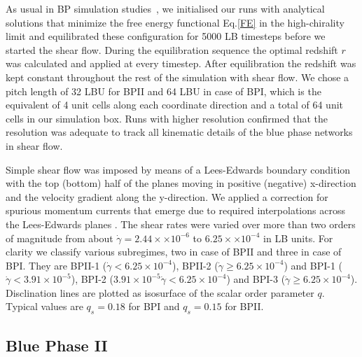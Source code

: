 \documentclass[aps,pre,reprint,superscriptaddress, twocolumn]{revtex4}
\newcommand{\e}[1]{\times10^{#1}}
\newcommand{\gd}{\dot{\gamma}}
\begin{document}
As usual in BP simulation studies~\cite{Henrich:2011a,Henrich:2010b}, we initialised our runs with 
analytical solutions that minimize the free energy functional Eq.\ref{FE} in the high-chirality limit 
and equilibrated these configuration for 5000 LB timesteps before we started the shear flow. 
During the equilibration sequence the optimal redshift $r$ was calculated and applied at every timestep.
After equilibration the redshift was kept constant throughout the rest of the simulation with shear flow.
We chose a pitch length of 32 LBU for BPII and 64 LBU in case of BPI, which is the equivalent 
of 4 unit cells along each coordinate direction and a total of 64 unit cells in our simulation box.
Runs with higher resolution confirmed that the resolution was adequate to track  
all kinematic details of the blue phase networks in shear flow.

Simple shear flow was imposed by means of a Lees-Edwards boundary condition ~\cite{Wagner:2002} with
the top (bottom) half of the planes moving in positive (negative) x-direction and the 
velocity gradient along the y-direction.
We applied a correction for spurious momentum currents that emerge due to required interpolations across 
the Lees-Edwards planes \cite{Henrich:2012a}.
The shear rates were varied over more than two orders of magnitude from about 
$\gd=2.44\times \e{-6}$ to $6.25\times\e{-4}$ in LB units.
For clarity we classify various subregimes, two in case of BPII and three in case of BPI. 
They are BPII-1 ($\gd < 6.25\e{-4}$), BPII-2 ($\gd\ge 6.25\e{-4}$) and
BPI-1 ($\gd < 3.91\e{-5}$), BPI-2 ($3.91\e{-5}\gd< 6.25\e{-4}$) and BPI-3 ($\gd\ge 6.25\e{-4}$). 
Disclination lines are plotted as isosurface of the scalar order parameter $q$. Typical values 
are $q_s=0.18$ for BPI and $q_s=0.15$ for BPII.


\subsection{Blue Phase II}
\end{document}

